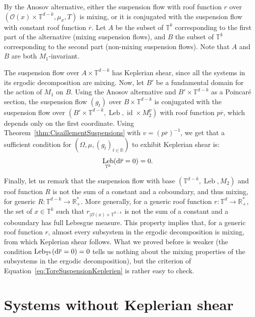 \documentclass[AHL,Unicode,longabstracts]{cedram}
\DeclareMathOperator{\id}{id}
\DeclareMathOperator{\Leb}{Leb}
\newcommand{\R}{\mathbb{R}}
\newcommand{\Tbb}{\mathbb{T}}
\newcommand{\Ocal}{\mathcal{O}}
\newcommand{\de}{{\rm d}}
\begin{document}

By the Anosov alternative, either the suspension flow with roof function $r$ over $(\Ocal (x) \times \Tbb^{d-k}, \mu_x, T)$ is mixing, or it is conjugated with the suspension flow with constant roof function $\overline{r}$. Let $A$ be the subset of $\Tbb^k$ corresponding to the first part of the alternative (mixing suspension flows), and $B$ the subset of $\Tbb^k$ corresponding to the second part (non-mixing suspension flows). Note that $A$ and $B$ are both $M_1$-invariant.


The suspension flow over $A \times \Tbb^{d-k}$ has Keplerian shear, since all the systems in its ergodic decomposition are mixing. Now, let $B'$ be a fundamental domain for the action of $M_1$ on $B$. Using the Anosov alternative and $B' \times \Tbb^{d-k}$ as a Poincaré section, the suspension flow $(g_t)$ over $B \times \Tbb^{d-k}$ is conjugated with the suspension flow over $(B' \times \Tbb^{d-k}, \Leb, \id \times M_2^p)$ with roof function $p \overline{r}$, which depends only on the first coordinate. Using Theorem~\ref{thm:CisaillementSuspensions} with $v = (p \overline{r})^{-1}$, we get that a sufficient condition for $(\Omega, \mu, (g_t)_{t \in \R})$ to exhibit Keplerian shear is:
\begin{equation}\label{eq:ToreSuspensionKeplerien}
\Leb_{\Tbb^k} (\de \overline{r} = 0) = 0.
\end{equation}

Finally, let us remark that the suspension flow with base $(\Tbb^{d-k}, \Leb, M_2)$ and roof function $R$ is not the sum of a constant and a coboundary, and thus mixing, for generic $R : \Tbb^{d-k} \to \R_+^*$. More generally, for a generic roof function $r : \Tbb^d \to \R_+^*$, the set of $x \in \Tbb^k$ such that $r_{|\Ocal(x)\times \Tbb^{d-k}}$ is not the sum of a constant and a coboundary has full Lebesgue measure. This property implies that, for a generic roof function $r$, almost every subsystem in the ergodic decomposition is mixing, from which Keplerian shear follows. What we proved before is weaker (the condition $\Leb_{\Tbb^k} (\de \overline{r} = 0) = 0$ tells us nothing about the mixing properties of the subsystems in the ergodic decomposition), but the criterion of Equation~\eqref{eq:ToreSuspensionKeplerien} is rather easy to check.


\section{Systems without Keplerian shear}\label{sec:SansMelange}
\end{document}
